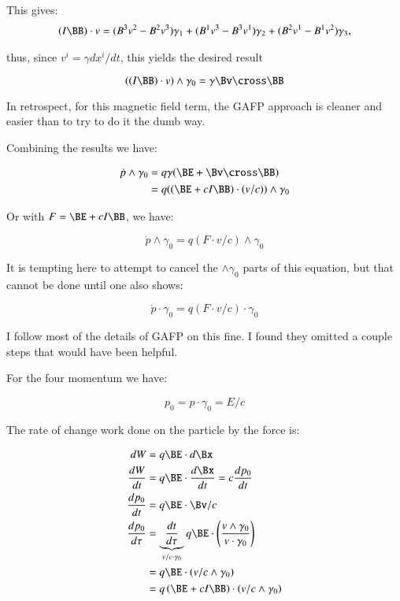 This gives:
\begin{align*}
(I \BB) \cdot v
= (B^3 v^2 - B^2 v^3) \gamma_1
+ (B^1 v^3 - B^3 v^1) \gamma_2
+ (B^2 v^1 - B^1 v^2) \gamma_3,
\end{align*}

thus, since $v^i = \gamma d{x^i}/dt$, this yields the desired result

\begin{equation*}
((I\BB) \cdot v) \wedge \gamma_0 = \gamma \Bv \cross \BB
\end{equation*}

In retrospect, for this magnetic field term, the GAFP approach is cleaner and easier than to try to do it the dumb way.

Combining the results we have:

\begin{align*}
\dot{p} \wedge \gamma_0
&= q \gamma ( \BE + \Bv \cross \BB ) \\
&= q (( \BE + c I \BB ) \cdot (v/c)) \wedge \gamma_0 \\
\end{align*}

Or with $F = \BE + c I \BB$, we have:

\begin{equation}\label{eqn:gafpLor:pvec}
\dot{p} \wedge \gamma_0 = q ( F \cdot v/c ) \wedge \gamma_0
\end{equation}

It is tempting here to attempt to cancel the $\wedge \gamma_0$ parts of this equation, but that cannot be done
until one also shows:

\begin{equation*}
\dot{p} \cdot \gamma_0 = q ( F \cdot v/c ) \cdot \gamma_0
\end{equation*}

I follow most of the details of GAFP on this fine.  I found they omitted a couple steps that would have been helpful.

For the four momentum we have:

\begin{equation*}
p_0 = p \cdot \gamma_0 = E/c
\end{equation*}

The rate of change work done on the particle by the force is:

\begin{align*}
dW &= q\BE \cdot d\Bx \\
\frac{dW}{dt} &= q\BE \cdot \frac{d\Bx}{dt} = c \frac{dp_0}{dt} \\
\frac{dp_0}{dt} &= q\BE \cdot \Bv/c \\
\frac{dp_0}{d\tau} &= \underbrace{\frac{dt}{d\tau}}_{v/c \cdot \gamma_0} q\BE \cdot \left( \frac{v \wedge \gamma_0}{v \cdot \gamma_0} \right) \\
                   &= q\BE \cdot \left(v/c \wedge \gamma_0\right) \\
                   &= q \left(\BE + c I \BB\right) \cdot \left(v/c \wedge \gamma_0\right) \\
\end{align*}

